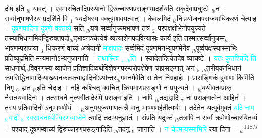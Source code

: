 \documentclass[article,12pt,a4paper]{memoir}%
\newcommand{\quotelemma}[1]{\textcolor{cyan}{#1}}
\newcounter{parCount}
\begin{document}
दोष इति {\tiny $_{lb}$} \leavevmode{} यावत् । एवमारचितादिप्रस्थानो द्विरुच्चारणप्रसङ्गम्प्रदर्शयति सकृदेवाप्रघुष्टो {\tiny $_{lb}$}न । सर्व्वानुभाषणेस्य प्रदर्शिते वि {\tiny $_{1}$} षयदोषस्य वक्तुमशक्यत्वात् । केवलमिदं {\tiny $_{lb}$}निःप्रयोजनपराजयाधिकरणं चेत्याह । \quotelemma{दूषणवादिना दूषणे वक्तव्ये} \cite[16b6]{vn-msN} सति {\tiny $_{lb}$}यत्र सर्व्वानुक्रमभाषणं तत्र {\tiny $_{2}$} परपक्षक्षोभेनोपयुज्यते तस्याभिधानमिदन्द्विरुक्तपदो{\tiny $_{lb}$}द्भावनञ्चेत्येवं व्यत्याशेनपदविन्यासः कार्य इति तस्मात्सर्व्वानुक्रम{\tiny $_{lb}$}भाषणम्पराजया {\tiny $_{3}$} धिकरणं वाच्यं अत्रेदानी \quotelemma{माक्षपादः} सर्व्वमिदं दूषणमनभ्युपगमेनैव {\tiny $_{lb}$}पूर्व्वपक्षस्यास्माभिः प्रतिव्यूढमिति मन्यमानोऽभ्यनुजानाति । \quotelemma{तथास्त्वि {\tiny $_{4}$} \cite[16b7]{vn-msN} {\tiny $_{lb}$}ति} । स्यादेतदित्येतदेव व्याचष्टे । \quotelemma{यतः कुतश्चिदि \cite[16b7]{vn-msN} ति} साधनार्थ{\tiny $_{lb}$}विवरणस्य व्याजेन प्रतिज्ञादिष्वर्थविशेषणपरम्परोपक्षेपेण चाप्रसङ्गात् अनं {\tiny $_{5}$} {\tiny $_{lb}$}तरीयकाभिधानं \cite[16b7]{vn-msN} रूपसिद्धिनामादिव्याख्यानकल्पत्त्वाद्वादिनोऽर्थान्तर{\tiny $_{lb}$}गमनमेवेति स तेन निग्रहार्हः । प्रासङ्गिकं ब्रुवाणः किमिति निगृ {\tiny $_{6}$} ह्यत {\tiny $_{lb}$}इति चेदाह । नहि कश्चित् क्वचित् क्रियमाणप्रसङ्गो न प्रयुज्यते । {\tiny $_{lb}$}यथोक्तम्प्राक् नैरात्म्यवादिनः । तत्साधने नृत्यगीतादेरपि प्रसङ्ग इति । नापि {\tiny $_{lb}$}तद्यद्वादि {\tiny $_{7}$} ना प्रसङ्गत्वेन आहितं । तस्य प्रतिवादिनो ऽनुभाषणीयं \cite[16b8]{vn-msN} । {\tiny $_{lb}$}अनुपयुज्यमाणत्वन्नै \uline{वानु} भाषणमर्हतीत्यर्थः । तदेतेन यत्पूर्वमुक्तं \quotelemma{यदि नाम {\tiny $_{lb}$}वादी {\tiny $_{8}$} स्वसाधनार्थविवरणव्याजेने} \cite[15b10]{vn-msN} त्यादि तदभ्यनुज्ञातं । संप्रति यदुक्तं {\tiny $_{lb}$}तत्रापि न सर्व्वं क्रमेणोच्चारयितव्यं । पश्चाद् दूषणम्वाच्यं द्विरुच्चारणप्रसङ्गादिति {\tiny $_{lb}$}तदनु {\tiny $_{9}$}\leavevmode{} जानाति । \quotelemma{न चेदमप्यस्माभिरि} त्या \cite[16b8]{vn-msN} दिना ।
	{}
	\pend%
      {\tiny $_{lb}$}\textsuperscript{\textenglish{118/s}}
\end{document}
